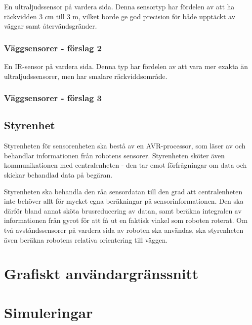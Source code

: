 \documentclass[a4paper,titlepage,12pt]{article}
\begin{document}
    En ultraljudssensor på vardera sida. Denna sensortyp har fördelen av att ha
    räckvidden 3 cm till 3 m, vilket borde ge god precision för både upptäckt
    av väggar samt återvändsgränder.

    \subsubsection{Väggsensorer - förslag 2}

    En IR-sensor på vardera sida. Denna typ har fördelen av att vara mer exakta
    än ultraljudssensorer, men har smalare räckviddsområde.

    \subsubsection{Väggsensorer - förslag 3}

    

    \subsection{Styrenhet}

    Styrenheten för sensorenheten ska bestå av en AVR-processor, som läser av och behandlar
    informationen från robotens sensorer. Styrenheten sköter även
    kommunikationen med centralenheten - den tar emot förfrågningar om data och
    skickar behandlad data på begäran.

    Styrenheten ska behandla den råa sensordatan till den grad att
    centralenheten inte behöver allt för mycket egna beräkningar på
    sensorinformationen. Den ska därför bland annat sköta brusreducering av
    datan, samt beräkna integralen av informationen från gyrot för att få ut en
    faktisk vinkel som roboten roterat. Om två avståndssensorer på vardera sida
    av roboten ska användas, ska styrenheten även beräkna robotens relativa
    orientering till väggen.
    

	\section{Grafiskt användargränssnitt}
    

	\section{Simuleringar}
    
\end{document}
